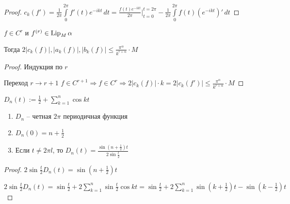 \begin{proof}\thmslashn
	
	$c_k(f') = \frac{1}{2\pi} \int\limits_{0}^{2\pi} f'(t) e^{-ikt}\, dt = \frac{f(t) e^{-ikt}}{2\pi}\Big|_{t = 0}^{t = 2\pi} - \frac{1}{2\pi}\int\limits_{0}^{2\pi} f(t) \left(e^{-ikt}\right)'\,dt$ 
	
\end{proof}

\begin{theorem}\thmslashn 

	$f\in C^r$ и $f^{(r)} \in \operatorname{Lip}_{M}\alpha$

	Тогда $2|c_k(f)|, |a_k(f)|, |b_k(f)| \leqslant \frac{\pi^\alpha}{k^{r + \alpha}}\cdot M$
	
\end{theorem}

\begin{proof}\thmslashn

	Индукция по $r$ 
	
	Переход $r \to r+1\,\, f\in C^{r + 1} \Rightarrow f \in C^r \Rightarrow 2|c_k(f)| \cdot k = 2|c_k(f')| \leqslant \frac{\pi^\alpha}{k^{r + \alpha}}\cdot M$

\end{proof}

\begin{definition}\thmslashn

	$D_n(t):= \frac{1}{2} + \sum\limits_{k = 1}^{n} \cos kt$

\end{definition}

\begin{properties}\thmslashn
	
	\begin{enumerate}
		\item 
		$D_n$ -- четная $2\pi$ периодичная функция
		
		\item 
		$D_n(0) = n + \frac{1}{2}$
		
		\item
		Если $t \not = 2\pi l$, то $D_n(t) = \frac{\sin(n+\frac{1}{2})t}{2\sin \frac{t}{2}}$
		
	\end{enumerate}
	
\end{properties}

\begin{proof}\thmslashn

	$2\sin \frac{t}{2} D_n(t) = \sin(n + \frac{1}{2})t$
	
	$2\sin \frac{t}{2} D_n(t) = \sin\frac{t}{2} + 2\sum\limits_{k = 1}^{n} \sin\frac{t}{2} \cos{kt} =  \sin\frac{t}{2} + 2\sum\limits_{k = 1}^{n} \sin(k + \frac{1}{2})t - \sin(k-\frac{1}{2})t$
	
\end{proof}

